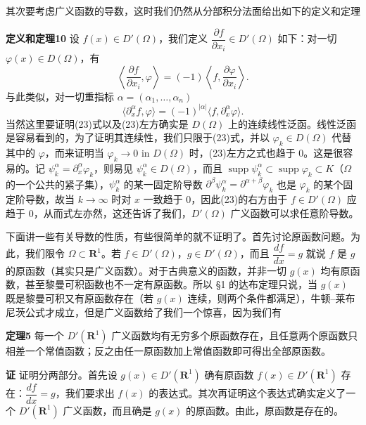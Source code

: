 其次要考虑广义函数的导数，这时我们仍然从分部积分法面给出如下的定义和定理

\noindent\textbf{定义和定理10}
设 $f(x)\in D'(\Omega)$，我们定义 $\dfrac{\partial f}{\partial x_i}\in D'(\Omega)$ 如下：对一切 $\varphi(x)\in D(\Omega)$，有
\begin{equation}
 \left\langle\frac{\partial f}{\partial x_i},\varphi\right\rangle
 =(-1)\left\langle f,\frac{\partial\varphi}{\partial x_i}\right\rangle.
 \tag{22}
\end{equation}
与此类似，对一切重指标 $\alpha=(\alpha_1,\ldots,\alpha_n)$
\begin{equation}
 \langle\partial_x^\alpha f,\varphi\rangle
 =(-1)^{|\alpha|}\langle f,\partial_x^\alpha\varphi\rangle.
 \tag{23}
\end{equation}
当然这里要证明(23)式以及(23)左方确实是 $D(\Omega)$ 上的连续线性泛函。线性泛函是容易看到的，为了证明其连续性，我们只限于(23)式，并以 $\varphi_k\in D(\Omega)$ 代替其中的 $\varphi$，而来证明当 $\varphi_k\to0$ in $D(\Omega)$ 时，(23)左方之式也趋于 0。这是很容易的。记 $\psi_k^\alpha=\partial_x^\alpha\varphi_k$，则易见 $\psi_k^\alpha\in D(\Omega)$，而且 $\operatorname{supp}\psi_k^\alpha\subset\operatorname{supp}\varphi_k\subset K$（$\Omega$ 的一个公共的紧子集），$\psi_k^\alpha$ 的某一固定阶导数 $\partial^\beta\psi_k^\alpha=\partial^{\alpha+\beta}\varphi_k$ 也是 $\varphi_k$ 的某个固定阶导数，故当 $k\to\infty$ 时对 $x$ 一致趋于 0，因此(23)的右方由于 $f\in D'(\Omega)$ 应趋于 0，从而式左亦然，这还告诉了我们，$D'(\Omega)$ 广义函数可以求任意阶导数。

下面讲一些有关导数的性质，有些很简单的就不证明了。首先讨论原函数问题。为此，我们限令 $\Omega\subset\mathbf R^1$。若 $f\in D'(\Omega)$，$g\in D'(\Omega)$，而且 $\dfrac{df}{dx}=g$ 就说 $f$ 是 $g$ 的原函数（其实只是广义函数）。对于古典意义的函数，并非一切 $g(x)$ 均有原函数，甚至黎曼可积函数也不一定有原函数。所以 §1 的达布定理只说，当 $g(x)$ 既是黎曼可积又有原函数存在（若 $g(x)$ 连续，则两个条件都满足），牛顿--莱布尼茨公式才成立，但是广义函数给了我们一个惊喜，因为我们有

\noindent\textbf{定理5}
每一个 $D'(\mathbf R^1)$ 广义函数均有无穷多个原函数存在，且任意两个原函数只相差一个常值函数；反之由任一原函数加上常值函数即可得出全部原函数。

\noindent\textbf{证}
证明分两部分。首先设 $g(x)\in D'(\mathbf R^1)$ 确有原函数 $f(x)\in D'(\mathbf R^1)$ 存在：$\dfrac{df}{dx}=g$，我们要求出 $f(x)$ 的表达式。其次再证明这个表达式确实定义了一个 $D'(\mathbf R^1)$ 广义函数，而且确是 $g(x)$ 的原函数。由此，原函数是存在的。

